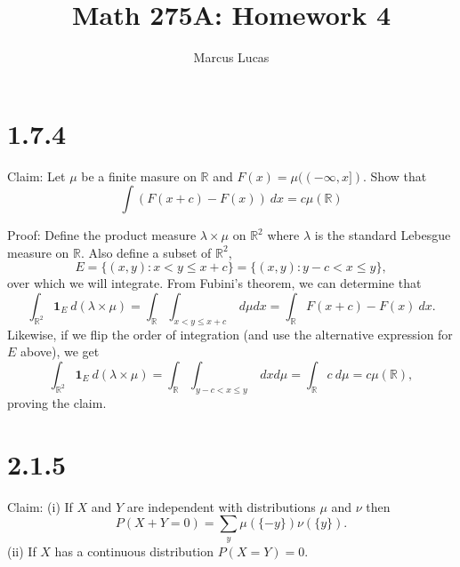 \documentclass[10pt]{article}
\title{Math 275A: Homework 4}
\author{Marcus Lucas}
\date{\vspace{-1cm}}
\begin{document}
\maketitle

\section*{1.7.4}

Claim: Let $\mu$ be a finite masure on $\mathbb{R}$
and $F(x) = \mu((-\infty,x])$. Show that
\begin{equation*}
  \int (F(x+c) - F(x)) \ dx = c \mu (\mathbb{R})
\end{equation*}

Proof: Define the product measure $\lambda \times \mu$
on $\mathbb{R}^2$ where $\lambda$ is the standard 
Lebesgue measure on $\mathbb{R}$. 
Also define a subset of $\mathbb{R}^2$,
\begin{equation*}
  E = \{(x,y) : x < y \le x + c \}
  = \{(x,y) : y - c < x \le y \},
\end{equation*}
over which we will integrate.
From Fubini's theorem, we can determine that
\begin{equation*}
  \int_{\mathbb{R}^2} \mathbf{1}_E \ d(\lambda \times \mu)
  = \int_{\mathbb{R}} \int_{x < y \le x+c} \ d\mu dx
  = \int_{\mathbb{R}} F(x+c) - F(x) \ dx.
\end{equation*}
Likewise, if we flip the order of integration 
(and use the alternative expression for $E$ above), we get
\begin{equation*}
  \int_{\mathbb{R}^2} \mathbf{1}_E \ d(\lambda \times \mu)
  = \int_{\mathbb{R}} \int_{y-c < x \le y} \ dx d\mu
  = \int_{\mathbb{R}} c \ d\mu = c \mu(\mathbb{R}),
\end{equation*}
proving the claim.

\section*{2.1.5}

Claim: (i) If $X$ and $Y$ are independent with distributions
$\mu$ and $\nu$ then
\begin{equation*}
  P(X + Y = 0) = \sum_y \mu(\{-y\}) \nu(\{y\}).
\end{equation*}
(ii) If $X$ has a continuous distribution $P(X = Y) = 0$.
\end{document}
